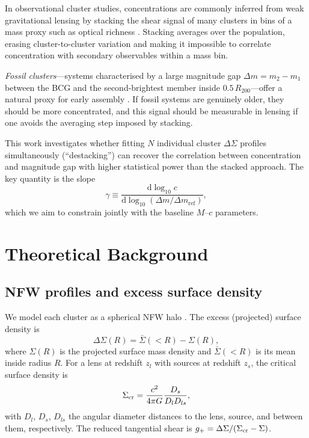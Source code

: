 \documentclass[12pt,a4paper]{article}
\begin{document}
In observational cluster studies, concentrations are commonly inferred from weak
gravitational lensing by stacking the shear signal of many clusters in bins of a
mass proxy such as optical richness \citep{Sheldon2004,Johnston2007,Mandelbaum2008}.
Stacking averages over the population, erasing cluster-to-cluster variation and making
it impossible to correlate concentration with secondary observables within a mass bin.

\textit{Fossil clusters}—systems characterised by a large magnitude gap
$\Delta m = m_2 - m_1$ between the BCG and the second-brightest member inside
$0.5\,R_{200}$—offer a natural proxy for early assembly \citep{Jones2003,Khosroshahi2006}.
If fossil systems are genuinely older, they should be more concentrated, and this signal
should be measurable in lensing if one avoids the averaging step imposed by stacking.

This work investigates whether fitting $N$ individual cluster $\Delta\Sigma$ profiles
simultaneously (``destacking'') can recover the correlation between concentration and
magnitude gap with higher statistical power than the stacked approach.  The key quantity
is the slope
\begin{equation}
  \gamma \equiv \frac{\mathrm{d}\log_{10}c}{\mathrm{d}\log_{10}(\Delta m/\Delta m_\mathrm{ref})},
  \label{eq:gamma_def}
\end{equation}
which we aim to constrain jointly with the baseline $M$--$c$ parameters.

\section{Theoretical Background}
\label{sec:theory}

\subsection{NFW profiles and excess surface density}

We model each cluster as a spherical NFW halo \citep{Navarro1997}.  The excess
(projected) surface density is
\begin{equation}
  \Delta\Sigma(R) = \bar{\Sigma}(<R) - \Sigma(R),
\end{equation}
where $\Sigma(R)$ is the projected surface mass density and $\bar{\Sigma}(<R)$ is its
mean inside radius $R$.  For a lens at redshift $z_l$ with sources at redshift $z_s$,
the critical surface density is
\begin{equation}
  \Sigma_{\rm cr} = \frac{c^2}{4\pi G}\frac{D_s}{D_l D_{ls}},
\end{equation}
with $D_l$, $D_s$, $D_{ls}$ the angular diameter distances to the lens, source, and
between them, respectively.  The reduced tangential shear is
$g_+ = \Delta\Sigma / (\Sigma_{\rm cr} - \Sigma)$.
\end{document}
